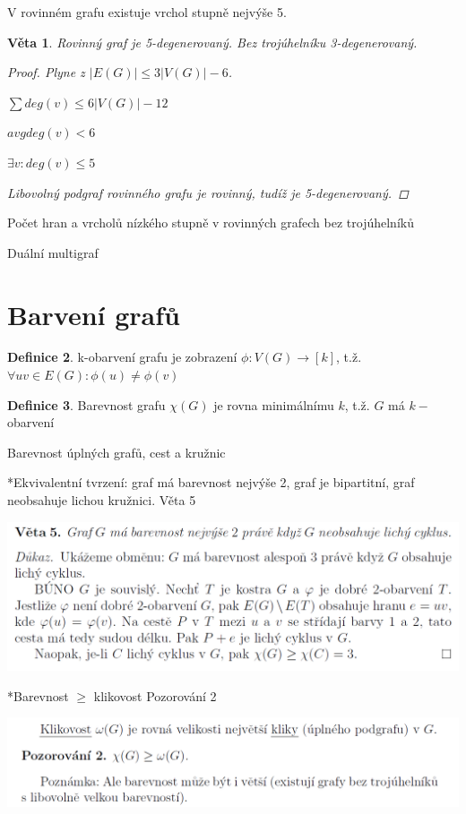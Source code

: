 \documentclass[10pt,a4paper]{article}
\theoremstyle{plain}
\newtheorem{veta}{Věta}
\theoremstyle{definition}
\newtheorem{definice}[veta]{Definice}
\begin{document}
V rovinném grafu existuje vrchol stupně nejvýše 5.


\begin{veta}
Rovinný graf je 5-degenerovaný. Bez trojúhelníku 3-degenerovaný.
\begin{proof}
Plyne z $|E(G)| \leq 3|V(G)| - 6$.

$\sum deg(v) \leq 6|V(G)| - 12$

$avg deg(v) < 6 $

$\exists v: deg(v) \leq 5$

Libovolný podgraf rovinného grafu je rovinný, tudíž je 5-degenerovaný.
\end{proof}
\end{veta}


Počet hran a vrcholů nízkého stupně v rovinných grafech bez trojúhelníků

Duální multigraf
\section{Barvení grafů}

\begin{definice}
k-obarvení grafu je zobrazení $\phi: V(G) \to [k]$, t.ž. $\forall uv \in E(G): \phi(u) \neq \phi(v)$
\end{definice}

\begin{definice}
Barevnost grafu $\chi(G)$ je rovna minimálnímu $k$, t.ž. $G$ má $k-$obarvení
\end{definice}

Barevnost úplných grafů, cest a kružnic

*Ekvivalentní tvrzení: graf má barevnost nejvýše 2, graf je bipartitní, graf neobsahuje lichou kružnici. Věta 5

\includegraphics[scale=0.5]{bipart.png} 

*Barevnost $\geq$ klikovost Pozorování 2

\includegraphics[scale=0.5]{klika.png} 
\end{document}
